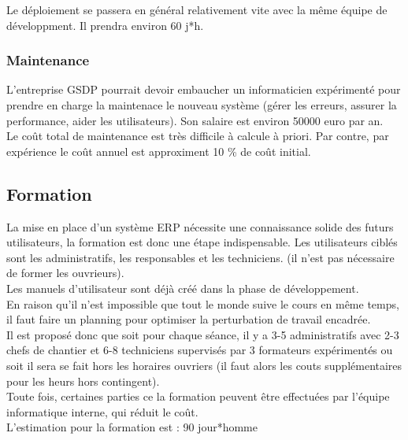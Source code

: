 \begin{enumerate}
Le déploiement se passera en général relativement vite avec la même équipe de développment. Il prendra environ 60 j*h.

\subsubsection{Maintenance}

L’entreprise GSDP pourrait devoir embaucher un informaticien expérimenté pour prendre en charge la maintenace le nouveau système (gérer les erreurs, assurer la performance, aider les utilisateurs). Son salaire est environ 50000 euro par an.\\

Le coût total de maintenance est très difficile à calcule à priori. 
Par contre, par expérience le coût annuel est approximent  10 \% de coût initial.

\subsection{Formation}
  La mise en place d'un système ERP nécessite une connaissance solide des futurs utilisateurs, la formation est donc une étape indispensable. Les utilisateurs ciblés sont les administratifs, les responsables et les techniciens. (il n'est pas nécessaire de former les ouvrieurs).\\

Les manuels d’utilisateur sont déjà créé dans la phase de développement.\\

En raison qu’il n'est impossible que tout le monde suive le cours en même temps, il faut faire un planning pour optimiser la perturbation de travail encadrée. \\
Il est proposé donc que soit pour chaque séance, il y a 3-5 administratifs avec  2-3 chefs de chantier et 6-8 techniciens supervisés par 3 formateurs expérimentés ou soit il sera se fait hors les horaires ouvriers (il faut alors les couts supplémentaires pour  les heurs hors contingent).\\
 
Toute fois, certaines parties ce la formation peuvent être effectuées par l'équipe informatique interne, qui réduit le coût.\\
 
L’estimation pour la formation est : 90 jour*homme

\end{enumerate}
